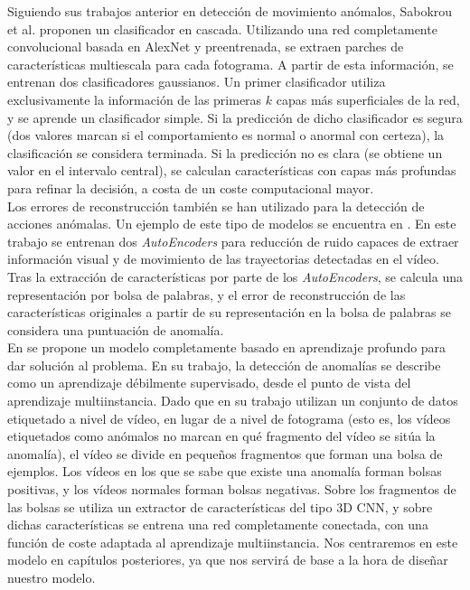 \documentclass[../main.tex]{memoir}
\begin{document}
Siguiendo sus trabajos anterior en detección de movimiento anómalos,
Sabokrou et al. \cite{sabokrou2018deep} proponen un clasificador en
cascada.  Utilizando una red completamente convolucional basada en
AlexNet y preentrenada, se extraen parches de características
multiescala para cada fotograma. A partir de esta información, se
entrenan dos clasificadores gaussianos. Un primer clasificador utiliza
exclusivamente la información de las primeras $k$ capas más
superficiales de la red, y se aprende un clasificador simple.  Si la
predicción de dicho clasificador es segura (dos valores marcan si el
comportamiento es normal o anormal con certeza), la clasificación se
considera terminada. Si la predicción no es clara (se obtiene un valor
en el intervalo central), se calculan características con capas más
profundas para refinar la decisión, a costa de un coste computacional
mayor.\\

Los errores de reconstrucción también se han utilizado para la
detección de acciones anómalas. Un ejemplo de este tipo de modelos se
encuentra en \cite{wang2019abnormal}. En este trabajo se entrenan dos
\textit{AutoEncoders} para reducción de ruido capaces de extraer
información visual y de movimiento de las trayectorias detectadas
en el vídeo. Tras la extracción de características por parte de los
\textit{AutoEncoders}, se calcula una representación por bolsa de
palabras, y el error de reconstrucción de las características
originales a partir de su representación en la bolsa de palabras se
considera una puntuación de anomalía.\\

En \cite{sultani2018real} se propone un modelo completamente basado en
aprendizaje profundo para dar solución al problema. En su trabajo, la
detección de anomalías se describe como un aprendizaje débilmente
supervisado, desde el punto de vista del aprendizaje multiinstancia.
Dado que en su trabajo utilizan un conjunto de datos etiquetado a
nivel de vídeo, en lugar de a nivel de fotograma (esto es, los vídeos
etiquetados como anómalos no marcan en qué fragmento del vídeo se
sitúa la anomalía), el vídeo se divide en pequeños fragmentos que
forman una bolsa de ejemplos. Los vídeos en los que se sabe que existe
una anomalía forman bolsas positivas, y los vídeos normales forman
bolsas negativas. Sobre los fragmentos de las bolsas se utiliza un
extractor de características del tipo 3D CNN, y sobre dichas
características se entrena una red completamente conectada, con una
función de coste adaptada al aprendizaje multiinstancia. Nos
centraremos en este modelo en capítulos posteriores, ya que nos
servirá de base a la hora de diseñar nuestro modelo.\\
\end{document}
